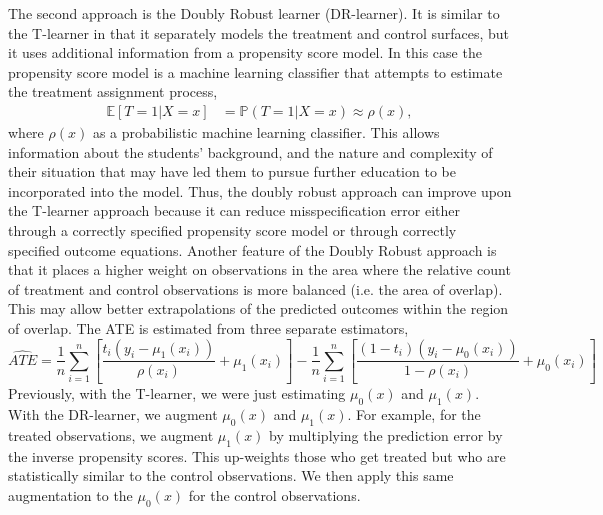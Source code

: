 \documentclass[12pt, a4paper]{article}
\begin{document}
The second approach is the Doubly Robust learner (DR-learner). It is similar to
the T-learner in that it separately models the treatment and control surfaces,
but it uses additional information from a propensity score model. In this case
the propensity score model is a machine learning classifier that attempts
to estimate the treatment assignment process,
\begin{align}
  \mathbb{E}[T{=}1|X{=}x] &= \mathbb{P}(T{=}1|X{=}x) \approx \rho(x),
\end{align}
where $\rho(x)$ as a probabilistic machine learning classifier. This allows
information about the students' background, and the nature and complexity of
their situation that may have led them to pursue further education to be
incorporated into the model. Thus, the doubly robust approach can improve upon
the T-learner approach because it can reduce misspecification error either
through a correctly specified propensity score model or through correctly
specified outcome equations. Another feature of the Doubly Robust approach is
that it places a higher weight on observations in the area where the relative
count of treatment and control observations is more balanced (i.e. the area of
overlap). This may allow better extrapolations of the predicted outcomes within
the region of overlap. The ATE is estimated from three separate estimators, 
\begin{equation}
  \hat{ATE} = \frac{1}{n} \sum_{i=1}^{n}
    \left[\frac{t_i(y_i - \mu_1(x_i))} {\rho(x_i)} + \mu_1(x_i) \right]
    - \frac{1}{n} \sum_{i=1}^{n} 
    \left[ \frac{(1-t_i)(y_i - \mu_0(x_i))}{1-\rho(x_i)} + \mu_0(x_i) \right] \label{eq:DR}
\end{equation}
Previously, with the T-learner, we were just estimating $\mu_0(x)$ and
$\mu_1(x)$. With the DR-learner, we augment $\mu_0(x)$ and $\mu_1(x)$. For
example, for the treated observations, we augment $\mu_1(x)$ by multiplying the
prediction error by the inverse propensity scores. This up-weights those who
get treated but who are statistically similar to the control observations. We
then apply this same augmentation to the $\mu_0(x)$ for the control
observations. 
\end{document}
